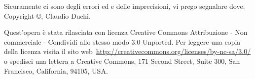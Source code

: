 Sicuramente ci sono degli errori ed e delle imprecisioni, vi  prego segnalare dove.
\vfill
Copyright \copyright\@ \the\year, Claudio Duchi.

Quest'opera è stata rilasciata con licenza Creative Commons Attribuzione - Non commerciale - Condividi allo stesso modo 3.0 Unported. Per leggere una copia della licenza visita il sito web\ \url{http://creativecommons.org/licenses/by-nc-sa/3.0/} o spedisci una lettera a Creative Commons, 171 Second Street, Suite 300, San Francisco, California, 94105, USA.\par \ccbyncsaeu %


	